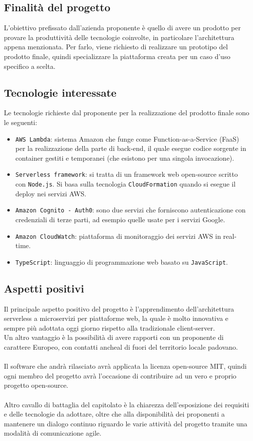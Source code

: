 \subsection{Finalità del progetto}
L'obiettivo prefissato dall'azienda proponente è quello di avere un prodotto per provare la produttività delle tecnologie coinvolte, in particolare l'architettura appena menzionata. Per farlo, viene richiesto di realizzare un prototipo del prodotto finale, quindi specializzare la piattaforma creata per un caso d'uso specifico a scelta.

\subsection{Tecnologie interessate}
Le tecnologie richieste dal proponente per la realizzazione del prodotto finale sono le seguenti:
\begin{itemize}
	\item \verb|AWS Lambda|: sistema Amazon che funge come Function-as-a-Service (FaaS) per la realizzazione della parte di back-end, il quale esegue codice sorgente in container gestiti e temporanei (che esistono per una singola invocazione).
	\item \verb|Serverless framework|: si tratta di un framework web open-source scritto con \verb|Node.js|. Si basa sulla tecnologia \verb|CloudFormation| quando si esegue il deploy nei servizi AWS.
	\item \verb|Amazon Cognito - Auth0|: sono due servizi che forniscono autenticazione con credenziali di terze parti, ad esempio quelle usate per i servizi Google.
	\item \verb|Amazon CloudWatch|: piattaforma di monitoraggio dei servizi AWS in real-time.
	\item \verb|TypeScript|: linguaggio di programmazione web basato su \verb|JavaScript|.
\end{itemize}

\subsection{Aspetti positivi}
Il principale aspetto positivo del progetto è l'apprendimento dell'architettura serverless a microservizi per piattaforme web, la quale è molto innovativa e sempre più adottata oggi giorno rispetto alla tradizionale client-server.\\
Un altro vantaggio è la possibilità di avere rapporti con un proponente di carattere Europeo, con contatti ancheal di fuori del territorio locale padovano.\\\\
Il software che andrà rilasciato avrà applicata la licenza open-source MIT, quindi ogni membro del progetto avrà l'occasione di contribuire ad un vero e proprio progetto open-source.\\\\
Altro cavallo di battaglia del capitolato è la chiarezza dell'esposizione dei requisiti e delle tecnologie da adottare, oltre che alla disponibilità dei proponenti a mantenere un dialogo continuo riguardo le varie attività del progetto tramite una modalità di comunicazione agile.

